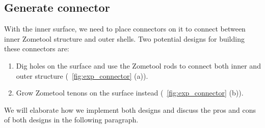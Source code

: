     
\subsection{Generate connector}
With the inner surface, we need to place connectors on it to connect between inner Zometool structure and outer shells.
Two potential designs for building these connectors are:
\begin{enumerate}
\item Dig holes on the surface and use the Zometool rods to connect both inner and outer structure (\figname~\ref{fig:exp_connector} (a)).
\item  Grow Zometool tenons on the  surface instead (\figname~\ref{fig:exp_connector} (b)).
\end{enumerate}
We will elaborate how we implement both designs and discuss the pros and cons of both designs in the following paragraph.
